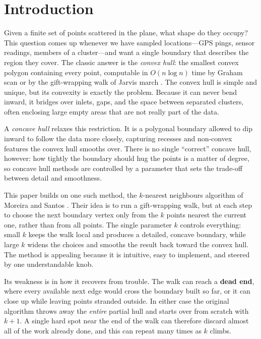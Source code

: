 \documentclass[10pt,twocolumn]{article}
\begin{document}
\section{Introduction}
Given a finite set of points scattered in the plane, what shape do they occupy? This question comes up whenever we have sampled locations---GPS pings, sensor readings, members of a cluster---and want a single boundary that describes the region they cover. The classic answer is the \emph{convex hull}: the smallest convex polygon containing every point, computable in $O(n\log n)$ time by Graham scan \citep{graham1972} or by the gift-wrapping walk of Jarvis march \citep{jarvis1973}. The convex hull is simple and unique, but its convexity is exactly the problem. Because it can never bend inward, it bridges over inlets, gaps, and the space between separated clusters, often enclosing large empty areas that are not really part of the data.

A \emph{concave hull} relaxes this restriction. It is a polygonal boundary allowed to dip inward to follow the data more closely, capturing recesses and non-convex features the convex hull smooths over. There is no single ``correct'' concave hull, however: how tightly the boundary should hug the points is a matter of degree, so concave hull methods are controlled by a parameter that sets the trade-off between detail and smoothness.

This paper builds on one such method, the $k$-nearest neighbours algorithm of Moreira and Santos \citep{moreira2007}. Their idea is to run a gift-wrapping walk, but at each step to choose the next boundary vertex only from the $k$ points nearest the current one, rather than from all points. The single parameter $k$ controls everything: small $k$ keeps the walk local and produces a detailed, concave boundary, while large $k$ widens the choices and smooths the result back toward the convex hull. The method is appealing because it is intuitive, easy to implement, and steered by one understandable knob.

Its weakness is in how it recovers from trouble. The walk can reach a \textbf{dead end}, where every available next edge would cross the boundary built so far, or it can close up while leaving points stranded outside. In either case the original algorithm throws away the \emph{entire} partial hull and starts over from scratch with $k+1$. A single hard spot near the end of the walk can therefore discard almost all of the work already done, and this can repeat many times as $k$ climbs.
\end{document}
